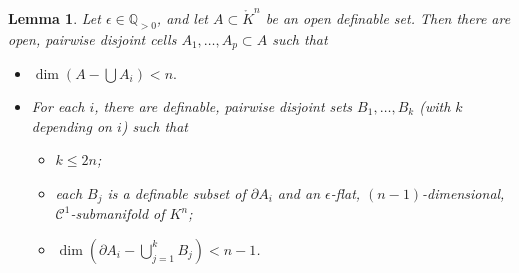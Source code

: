 \documentclass[a4paper, 12pt, final]{article}
\newtheorem{lem}{Lemma}[section]
\newtheorem{open problem}[lem]{Open problem}
\theoremstyle{remark}
\theoremstyle{definition}
\newtheorem{final remark}[lem]{Final remark}
\begin{document}
 \begin{lem}\label{top dimension}Let $\epsilon\in\mathbb{Q}_{>0}$, and let $A\subset{\mathring {K}}^n$ be an open  
 definable set. Then there are open, pairwise disjoint cells $A_1,\dots,A_p\subset A$ such that 
\begin{itemize}
  \item[\rm{(i)}]$\dim(A - \bigcup A_i)<n.$
  \item[\rm{(ii)}]For each $i$, there are definable, pairwise disjoint sets $B_1,\dots,B_k$ (with $k$ depending on $i$) such that
  \begin{itemize}
    \item[\rm{(a)}]$k\leq 2n$;
    \item[\rm{(b)}]each $B_j$ is a definable subset of $\partial A_i$ and  an
    $\epsilon$-flat, 					
    $(n-1)$-dimensional, ${\mathcal C^1}$-submanifold of ${K}^n$;
    \item[\rm{(c)}]$\dim(\partial A_i - \bigcup_{j=1}^k B_j)<n-1$.
  \end{itemize}
\end{itemize}
\end{lem}
\end{document}
